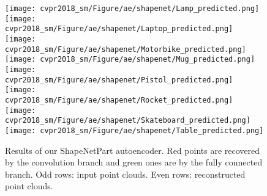 \documentclass[10pt,twocolumn,letterpaper]{article}
\begin{document}
\begin{figure*}[t]
        \texttt{[image: cvpr2018\_sm/Figure/ae/shapenet/Lamp\_predicted.png]}
        \texttt{[image: cvpr2018\_sm/Figure/ae/shapenet/Laptop\_predicted.png]}
        \texttt{[image: cvpr2018\_sm/Figure/ae/shapenet/Motorbike\_predicted.png]}
        \texttt{[image: cvpr2018\_sm/Figure/ae/shapenet/Mug\_predicted.png]}
        \texttt{[image: cvpr2018\_sm/Figure/ae/shapenet/Pistol\_predicted.png]}
        \texttt{[image: cvpr2018\_sm/Figure/ae/shapenet/Rocket\_predicted.png]}
        \texttt{[image: cvpr2018\_sm/Figure/ae/shapenet/Skateboard\_predicted.png]}
        \texttt{[image: cvpr2018\_sm/Figure/ae/shapenet/Table\_predicted.png]}
        
        \caption{Results of our ShapeNetPart autoencoder. Red points are recovered by the convolution branch and green ones are by the fully connected branch. Odd rows: input point clouds. Even rows: reconstructed point clouds.}
        \label{fig_ae_shapenet}
        \vspace{-4pt}
\end{figure*}
\end{document}
